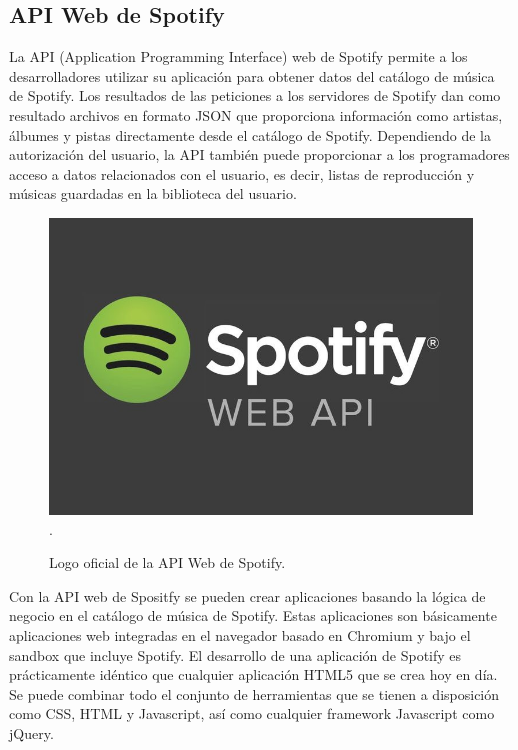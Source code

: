 \documentclass[conference]{IEEEtran}
\begin{document}
\subsection{API Web de Spotify}
La API (Application Programming Interface) web de Spotify permite a los desarrolladores utilizar su aplicación para obtener datos del catálogo de música de Spotify. Los resultados de las peticiones a los servidores de Spotify dan como resultado archivos en formato JSON que proporciona información como artistas, álbumes y pistas directamente desde el catálogo de Spotify. Dependiendo de la autorización del usuario, la API también puede proporcionar a los programadores acceso a datos relacionados con el usuario, es decir, listas de reproducción y músicas guardadas en la biblioteca del usuario.\\

\begin{figure}[ht]
    \centering
    \includegraphics[scale=0.20]{./images/APIWebSpotify.jpg}
    \DeclareGraphicsExtensions.
    \caption{ Logo oficial de la API Web de Spotify. }
\end{figure}

Con la API web de Spositfy se pueden crear aplicaciones basando la lógica de negocio en el catálogo de música de Spotify. Estas aplicaciones son básicamente aplicaciones web integradas en el navegador basado en Chromium y bajo el sandbox que incluye Spotify. El desarrollo de una aplicación de Spotify es prácticamente idéntico que cualquier aplicación HTML5 que se crea hoy en día. Se puede combinar todo el conjunto de herramientas que se tienen a disposición como CSS, HTML y Javascript, así como cualquier framework Javascript como jQuery.
\end{document}

